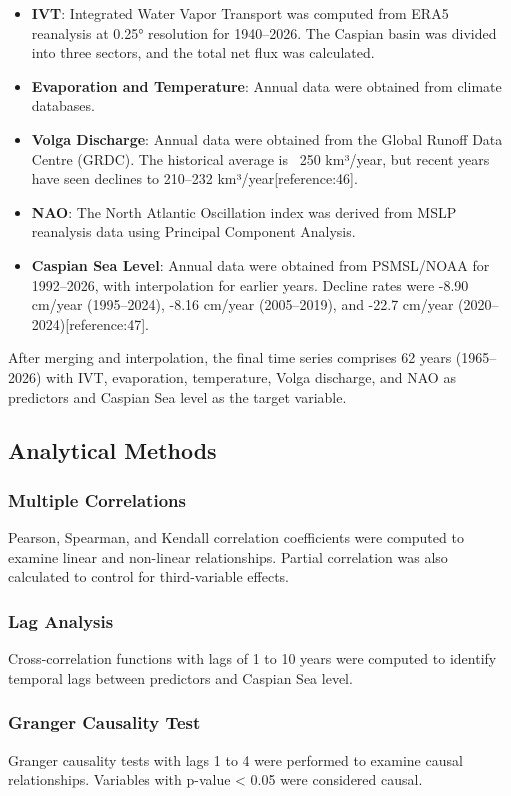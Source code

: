 \documentclass[12pt,letterpaper]{article}
\begin{document}
\begin{itemize}
\item \textbf{IVT}: Integrated Water Vapor Transport was computed from ERA5 reanalysis at 0.25° resolution for 1940–2026. The Caspian basin was divided into three sectors, and the total net flux was calculated.
\item \textbf{Evaporation and Temperature}: Annual data were obtained from climate databases.
\item \textbf{Volga Discharge}: Annual data were obtained from the Global Runoff Data Centre (GRDC). The historical average is ~250 km³/year, but recent years have seen declines to 210–232 km³/year[reference:46].
\item \textbf{NAO}: The North Atlantic Oscillation index was derived from MSLP reanalysis data using Principal Component Analysis.
\item \textbf{Caspian Sea Level}: Annual data were obtained from PSMSL/NOAA for 1992–2026, with interpolation for earlier years. Decline rates were -8.90 cm/year (1995–2024), -8.16 cm/year (2005–2019), and -22.7 cm/year (2020–2024)[reference:47].
\end{itemize}

After merging and interpolation, the final time series comprises 62 years (1965–2026) with IVT, evaporation, temperature, Volga discharge, and NAO as predictors and Caspian Sea level as the target variable.

\subsection{Analytical Methods}

\subsubsection{Multiple Correlations}
Pearson, Spearman, and Kendall correlation coefficients were computed to examine linear and non-linear relationships. Partial correlation was also calculated to control for third-variable effects.

\subsubsection{Lag Analysis}
Cross-correlation functions with lags of 1 to 10 years were computed to identify temporal lags between predictors and Caspian Sea level.

\subsubsection{Granger Causality Test}
Granger causality tests with lags 1 to 4 were performed to examine causal relationships. Variables with p-value < 0.05 were considered causal.
\end{document}
